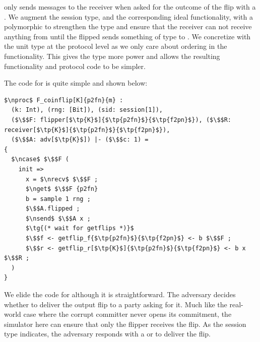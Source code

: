 \Fflip only sends messages to the receiver when asked for the outcome of the flip with a . 
We augment the session type, and the corresponding ideal functionality, with a polymorphic  to strengthen the type and ensure that the receiver can not receive anything from  until the flipped sends something of type  to \Fflip.
We concretize  with the unit type \inline{()} at the protocol level as we only care about ordering in the functionality. 
This gives the type more power and allows the resulting functionality and protocol code to be simpler. 

The code for \Fflip is quite simple and shown below:
\begin{lstlisting}[basicstyle=\scriptsize\BeraMonottFamily, frame=single, mathescape]
$\nproc$ F_coinflip[K]{p2fn}{m} :
  (k: Int), (rng: [Bit]), (sid: session[1]),
  ($\$$F: flipper[$\tp{K}$]{$\tp{p2fn}$}{$\tp{f2pn}$}), ($\$$R: receiver[$\tp{K}$]{$\tp{p2fn}$}{$\tp{f2pn}$}),
  ($\$$A: adv[$\tp{K}$]) |- ($\$$c: 1) =
{
  $\ncase$ $\$$F (
    init =>
      x = $\nrecv$ $\$$F ;
      $\nget$ $\$$F {p2fn}
      b = sample 1 rng ;
      $\$$A.flipped ;
      $\nsend$ $\$$A x ;
      $\tg{(* wait for getflips *)}$
      $\$$f <- getflip_f{$\tp{p2fn}$}{$\tp{f2pn}$} <- b $\$$F ;
      $\$$r <- getflip_r[$\tp{K}$]{$\tp{p2fn}$}{$\tp{f2pn}$} <- b x $\$$R ;
  )
}
\end{lstlisting}
We elide the code for  although it is straightforward. 
The adversary decides whether to deliver the output flip to a party asking for it.
Much like the real-world case where the corrupt committer never opens its commitment, the simulator here can ensure that only the flipper receives the flip.
As the session type indicates, the adversary responds with a  or  to deliver the flip.


